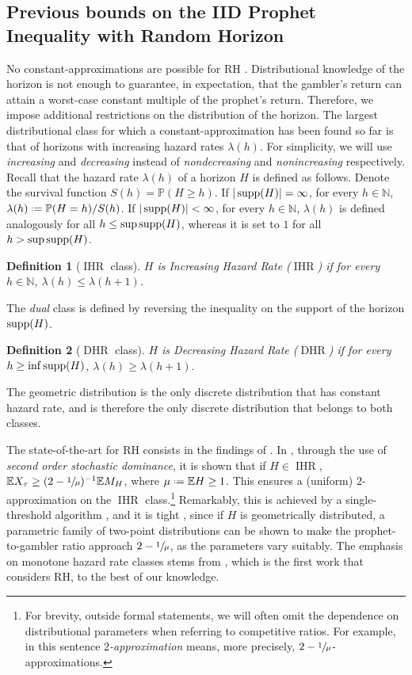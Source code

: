 \documentclass[11pt, a4paper, twoside]{article}
\newcommand*{\defeq}{\mathrel{\vcenter{\baselineskip0.5ex \lineskiplimit0pt
			\hbox{\scriptsize.}\hbox{\scriptsize.}}}=}
\newcommand{\NN}{\mathbb{N}}
\newcommand{\EE}{\mathbb{E}}
\newcommand{\PP}{\mathbb{P}}
\DeclareMathOperator{\IHR}{IHR}
\DeclareMathOperator{\DHR}{DHR}
\newtheorem{definition}{Definition}[section]
\numberwithin{equation}{section}
\begin{document}
	\subsection{Previous bounds on the IID Prophet Inequality with Random Horizon}\label{bounds}
	No constant-approximations are possible for RH \cite[Theorem~1.6]{AliBanGolMunWan20}. Distributional knowledge of the horizon is not enough to guarantee, in expectation, that the gambler's return can attain a worst-case constant multiple of the prophet's return. Therefore, we impose additional restrictions on the distribution of the horizon.  The largest distributional class for which a constant-approximation has been found so far is that of horizons with increasing hazard rates $\lambda(h)$. For simplicity, we will use \textit{increasing} and \textit{decreasing} instead of \textit{nondecreasing} and \textit{nonincreasing} respectively. Recall that the hazard rate $\lambda(h)$ of a horizon $H$ is defined as follows. Denote the survival function $S(h)=\PP(H\ge h)$. If $|\operatorname{supp}(H)|=\infty$, for every $h\in\NN$, $\lambda(h)\defeq \PP(H=h)/S(h)$. If $|\operatorname{supp}(H)|<\infty$, for every $h\in\NN$, $\lambda(h)$ is defined analogously for all $ h\le\sup\operatorname{supp}(H)$, whereas it is set to $1$ for all $h>\sup\operatorname{supp}(H)$. \begin{definition}[$\IHR$ class]
		$H$ is \emph{Increasing Hazard Rate ($\IHR$)} if for every $h\in\NN$, $\lambda(h)\le\lambda(h+1)$.
	\end{definition}
	The \textit{dual} class is defined by reversing the inequality on the support of the horizon $\operatorname{supp}(H)$.\begin{definition}[$\DHR$ class]
		$H$ is \emph{Decreasing Hazard Rate ($\DHR$)} if for every $h\ge\inf\operatorname{supp}(H)$, $\lambda(h)\ge\lambda(h+1)$.
	\end{definition}
	The geometric distribution is the only discrete distribution that has constant hazard rate, and is therefore the only discrete distribution that belongs to both classes.
	
	The state-of-the-art for RH consists in the findings of \cite{AliBanGolMunWan20}. In \cite[Theorem~3.2]{AliBanGolMunWan20}, through the use of \emph{second order stochastic dominance}, it is shown that if $H\in\IHR$, $\EE X_\tau\ge  (2-\sfrac{1}{\mu})^{-1} \EE M_H$, where $\mu\defeq\EE H\ge 1$. This ensures a (uniform) $2$-approximation on the $\IHR$ class.\footnote{For brevity, outside formal statements, we will often omit the dependence on distributional parameters when referring to competitive ratios. For example, in this sentence \textit{$2$-approximation} means, more precisely, $2-\sfrac{1}{\mu}$-approximations.}  Remarkably, this is achieved by a single-threshold algorithm \cite[Theorem~3.1]{AliBanGolMunWan20}, and it is tight \cite[Theorem~3.5]{AliBanGolMunWan20}, since if $H$ is geometrically distributed, a parametric family of two-point distributions can be shown to make the prophet-to-gambler ratio approach $2-\sfrac{1}{\mu}$, as the parameters vary suitably. The emphasis on monotone hazard rate classes stems from \cite{HajKleSan07}, which is the first work that considers RH, to the best of our knowledge.
	
\end{document}
